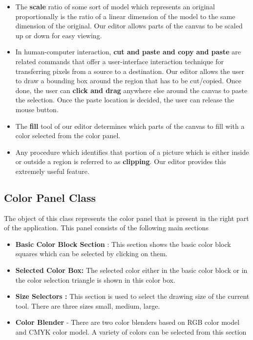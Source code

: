 \documentclass[12pt]{report}
\begin{document}
\begin{itemize}
\item{The \textbf{scale }ratio of some sort of model which represents an original proportionally is the ratio of a linear dimension of the model to the same dimension of the original. Our editor allows parts of the canvas to be scaled up or down for easy viewing.}
\item{In human-computer interaction, \textbf{cut and paste and copy and paste} are related commands that offer a user-interface interaction technique for transferring pixels from a source to a destination. Our editor allows the user to draw a bounding box around the region that has to be cut/copied. Once done, the user can \textbf{click and drag} anywhere else around the canvas to paste the selection. Once the paste location is decided, the user can release the mouse button.}
\item{The \textbf{fill }tool of our editor determines which parts of the canvas to fill with a color selected from the color panel.}
\item{Any procedure which identifies that portion of a picture which is either inside or outside a region is referred to as \textbf{clipping}. Our editor provides this extremely useful feature.}

\end{itemize}


\subsection{Color Panel Class}
The object of this class represents  the color panel that is present in the right part of the application. This panel consists of the following main sections
\begin{itemize}
\item{\textbf{Basic Color Block Section }}: This section shows the basic color block squares which can be selected by clicking on them.
\item{\textbf{Selected Color Box:}} The selected color either in the basic color block or in the color selection triangle is shown in this color box.
\item{\textbf{Size Selectors :}} This section is used to select the drawing size of the current tool. There are three sizes small, medium, large.
\item{\textbf{Color Blender }}- There are two color blenders based on RGB color model and CMYK color model. A variety of colors can be selected from this section
\end{itemize}
\end{document}
